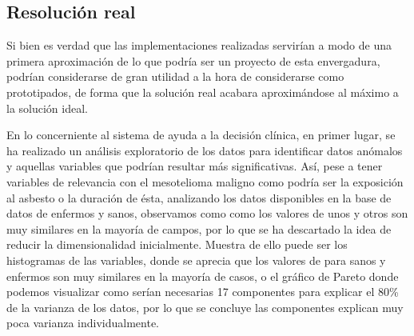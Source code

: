 \documentclass{article}
\begin{document}
\vfill
\subsection{Resolución real}

Si bien es verdad que las implementaciones realizadas servirían a modo
de una primera aproximación de lo que podría ser un proyecto  de  esta
envergadura, podrían considerarse  de  gran  utilidad  a  la  hora  de
considerarse como prototipados, de forma que la solución real  acabara
aproximándose al máximo a la solución ideal.

En lo concerniente al sistema de  ayuda  a  la	decisión  clínica,  en
primer lugar, se ha realizado un análisis exploratorio	de  los  datos
para identificar datos	anómalos  y  aquellas  variables  que  podrían
resultar más significativas. Así, pese a tener variables de relevancia
con el mesotelioma maligno como podría ser la exposición al asbesto  o
la duración de ésta, analizando los datos disponibles en  la  base  de
datos de enfermos y sanos, observamos como como los valores de unos  y
otros son muy similares en la mayoría de campos,  por  lo  que	se  ha
descartado la idea de reducir la dimensionalidad inicialmente. Muestra
de ello puede ser los histogramas de las variables, donde  se  aprecia
que los valores de para sanos y  enfermos  son	muy  similares	en  la
mayoría de casos, o el gráfico de Pareto donde podemos visualizar como
serían necesarias 17 componentes para explicar el 80\% de la  varianza
de los datos, por lo que se concluye las componentes explican muy poca
varianza individualmente.

\vfill
\end{document}
